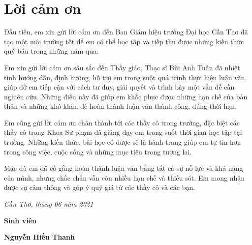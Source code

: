 \chapter*{Lời cảm ơn}

Đầu tiên, em xin gửi lời cảm ơn đến Ban Giám hiệu trường Đại học Cần Thơ đã tạo một môi trường tốt để em có thể học tập và tiếp thu được những kiến thức quý báu trong những năm qua.\par
Em xin gửi lời cảm ơn sâu sắc đến Thầy giáo, Thạc sĩ Bùi Anh Tuấn đã nhiệt tình hướng dẫn, định hướng, hỗ trợ em trong suốt quá trình thực hiện luận văn, giúp đỡ em tiếp cận với cách tư duy, giải quyết và trình bày một vấn đề cần nghiên cứu. Những điều này đã giúp em khắc phục được những hạn chế của bản thân và những khó khăn để hoàn thành luận văn thành công, đúng thời hạn.\par
Em cũng gửi lời cảm ơn chân thành tới các thầy cô trong trường, đặc biệt các thầy cô trong Khoa Sư phạm đã giảng dạy em trong suốt thời gian học tập tại trường. Những kiến thức, bài học có được sẽ là hành trang giúp em tự tin hơn trong công việc, cuộc sống và những mục tiêu trong tương lai.\par
Mặc dù em đã cố gắng hoàn thành luận văn bằng tất cả sự nỗ lực và khả năng của mình, nhưng chắc chắn vẫn còn nhiều hạn chế và thiếu sót. Em mong nhận được sự cảm thông và góp ý quý giá từ các thầy cô và các bạn.\par

\begin{adjustwidth}{8cm}{0cm}
	\centering
	\textit{Cần Thơ, tháng 06 năm 2021}\par
	\textbf{Sinh viên}\par
	\vspace{3cm}
	\textbf{Nguyễn Hiếu Thanh}\par
\end{adjustwidth}\par

